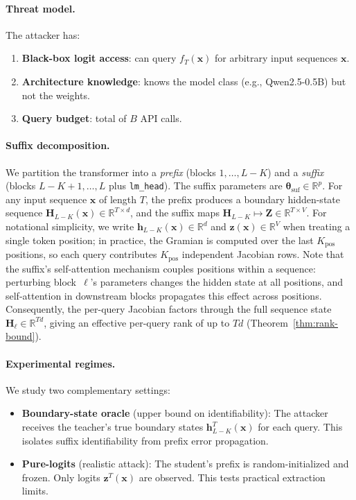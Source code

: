 \documentclass{article}
\newcommand{\R}{\mathbb{R}}
\newcommand{\btheta}{\boldsymbol{\theta}}
\newcommand{\bz}{\mathbf{z}}
\newcommand{\bh}{\mathbf{h}}
\newcommand{\bx}{\mathbf{x}}
\newcommand{\bH}{\mathbf{H}}
\newcommand{\bZ}{\mathbf{Z}}
\begin{document}
\paragraph{Threat model.}
The attacker has:
\begin{enumerate}
 \item \textbf{Black-box logit access}: can query $f_T(\bx)$ for arbitrary input sequences $\bx$.
 \item \textbf{Architecture knowledge}: knows the model class (e.g., Qwen2.5-0.5B) but not the weights.
 \item \textbf{Query budget}: total of $B$ API calls.
\end{enumerate}

\paragraph{Suffix decomposition.}
We partition the transformer into a \emph{prefix} (blocks $1, \ldots, L-K$) and a \emph{suffix} (blocks $L-K+1, \ldots, L$ plus \texttt{lm\_head}). The suffix parameters are $\btheta_{\text{suf}} \in \R^p$. For any input sequence $\bx$ of length $T$, the prefix produces a boundary hidden-state sequence $\bH_{L-K}(\bx) \in \R^{T \times d}$, and the suffix maps $\bH_{L-K} \mapsto \bZ \in \R^{T \times V}$. For notational simplicity, we write $\bh_{L-K}(\bx) \in \R^d$ and $\bz(\bx) \in \R^V$ when treating a single token position; in practice, the Gramian is computed over the last $K_{\text{pos}}$ positions, so each query contributes $K_{\text{pos}}$ independent Jacobian rows. Note that the suffix's self-attention mechanism couples positions within a sequence: perturbing block~$\ell$'s parameters changes the hidden state at all positions, and self-attention in downstream blocks propagates this effect across positions. Consequently, the per-query Jacobian factors through the full sequence state $\bH_\ell \in \R^{Td}$, giving an effective per-query rank of up to $Td$ (Theorem~\ref{thm:rank-bound}).

\paragraph{Experimental regimes.}
We study two complementary settings:

\begin{itemize}
 \item \textbf{Boundary-state oracle} (upper bound on identifiability): The attacker receives the teacher's true boundary states $\bh^T_{L-K}(\bx)$ for each query. This isolates suffix identifiability from prefix error propagation.
 \item \textbf{Pure-logits} (realistic attack): The student's prefix is random-initialized and frozen. Only logits $\bz^T(\bx)$ are observed. This tests practical extraction limits.
\end{itemize}
\end{document}

